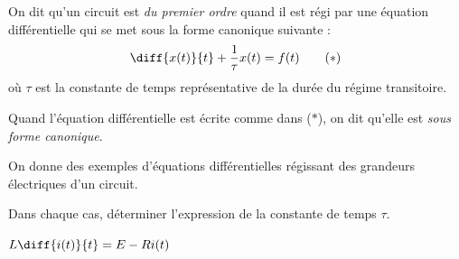 
\bigskip

On dit qu'un circuit est \emph{du premier ordre} quand il est régi par une équation différentielle qui se met sous la forme canonique suivante : 
\[
\diff{x(t)}{t} + \frac{1}{\tau} x(t) = f(t) \tag{$\ast$}
\]
où $\tau$ est la constante de temps représentative de la durée du régime transitoire.

Quand l'équation différentielle est écrite comme dans ($\ast$), on dit qu'elle est \emph{sous forme canonique}.




\hauteurLargeurCadreReponse		{8mm}{3cm}
\initialisationEntrainement

On donne des exemples d'équations différentielles régissant des grandeurs électriques d'un circuit. 

Dans chaque cas, déterminer l'expression de la constante de temps $\tau$.


\debutEntrainement


\begin{enonce}
$L\diff{i(t)}{t}  =E- Ri(t)$
\end{enonce}

